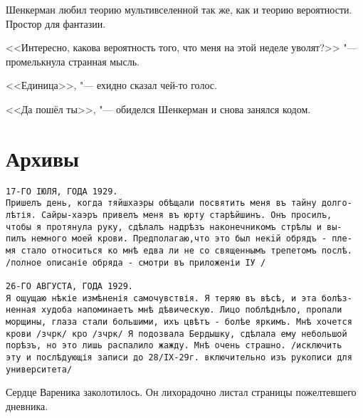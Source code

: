 Шенкерман любил теорию мультивселенной так же, как и теорию вероятности.
Простор для фантазии.

<<Интересно, какова вероятность того, что меня на этой неделе уволят?>> "--- промелькнула странная мысль.

<<Единица>>, "--- ехидно сказал чей-то голос.

<<Да пошёл ты>>, "--- обиделся Шенкерман и снова занялся кодом.

\section{Архивы}


\begin{verbatim}
17-ГО IЮЛЯ, ГОДА 1929.
Пришелъ день, когда тяйшхаэры обѣщали посвятить меня въ тайну долго-
лѣтія. Сайры-хаэръ привелъ меня въ юрту старѣйшинъ. Онъ просилъ,
чтобы я протянула руку, сдѣлалъ надрѣзъ наконечникомъ стрѣлы и вы-
пилъ немного моей крови. Предполагаю,что это был некiй обрядъ - пле-
мя стало относиться ко мнѣ едва ли не со священнымъ трепетомъ послѣ.
/полное описаніе обряда - смотри въ приложеніи IУ /

26-ГО АВГУСТА, ГОДА 1929.
Я ощущаю нѣкіе измѣненія самочувствія. Я теряю въ вѣсѣ, и эта болѣз-
ненная худоба напоминаетъ мнѣ дѣвическую. Лицо поблѣднѣло, пропали
морщины, глаза стали большими, ихъ цвѣтъ - болѣе яркимъ. Мнѣ хочется
крови /зчрк/ кро /зчрк/ Я подозвала Бердышку, сдѣлала ему небольшой
порѣзъ, но это лишь распалило жажду. Мнѣ очень страшно. /исключить
эту и послѣдующія записи до 28/IX-29г. включительно изъ рукописи для
университета/
\end{verbatim}

Сердце Вареника заколотилось.
Он лихорадочно листал страницы пожелтевшего дневника.

